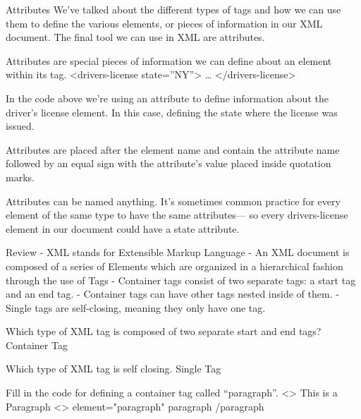     Attributes
        We’ve talked about the different types of tags and how we can use them to define the various elements, or pieces of information in our XML document. The final tool we can use in XML are attributes.

        Attributes are special pieces of information we can define about an element within its tag.
            <drivers-license state=”NY”> … </drivers-license>

        In the code above we’re using an attribute to define information about the driver’s license element. In this case, defining the state where the license was issued.

        Attributes are placed after the element name and contain the attribute name followed by an equal sign with the attribute’s value placed inside quotation marks.

        Attributes can be named anything. It’s sometimes common practice for every element of the same type to have the same attributes— so every drivers-license element in our document could have a state attribute.

    Review
        - XML stands for Extensible Markup Language
        - An XML document is composed of a series of Elements which are organized in a hierarchical fashion through the use of Tags
        - Container tags consist of two separate tags: a start tag and an end tag.
        - Container tags can have other tags nested inside of them.
        - Single tags are self-closing, meaning they only have one tag.
        
    
    Which type of XML tag is composed of two separate start and end tags?
        Container Tag

    Which type of XML tag is self closing.
        Single Tag

    Fill in the code for defining a container tag called “paragraph”.
        <> This is a Paragraph <>
            element="paragraph"
            \Paragraph
            paragraph
            /paragraph